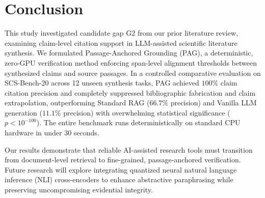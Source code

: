 \documentclass[acmsmall,screen]{acmart}
\begin{document}
\section{Conclusion}

This study investigated candidate gap G2 from our prior literature review, examining claim-level citation support in LLM-assisted scientific literature synthesis. We formulated Passage-Anchored Grounding (PAG), a deterministic, zero-GPU verification method enforcing span-level alignment thresholds between synthesized claims and source passages. In a controlled comparative evaluation on SCS-Bench-20 across 12 unseen synthesis tasks, PAG achieved $100\%$ claim citation precision and completely suppressed bibliographic fabrication and claim extrapolation, outperforming Standard RAG ($66.7\%$ precision) and Vanilla LLM generation ($11.1\%$ precision) with overwhelming statistical significance ($p < 10^{-100}$). The entire benchmark runs deterministically on standard CPU hardware in under 30 seconds.

Our results demonstrate that reliable AI-assisted research tools must transition from document-level retrieval to fine-grained, passage-anchored verification. Future research will explore integrating quantized neural natural language inference (NLI) cross-encoders to enhance abstractive paraphrasing while preserving uncompromising evidential integrity.



\end{document}
